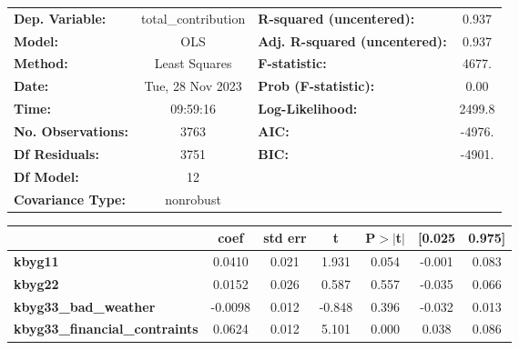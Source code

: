 \begin{center}
\begin{tabular}{lclc}
\toprule
\textbf{Dep. Variable:}                      & total\_contribution & \textbf{  R-squared (uncentered):}      &     0.937   \\
\textbf{Model:}                              &         OLS         & \textbf{  Adj. R-squared (uncentered):} &     0.937   \\
\textbf{Method:}                             &    Least Squares    & \textbf{  F-statistic:       }          &     4677.   \\
\textbf{Date:}                               &   Tue, 28 Nov 2023  & \textbf{  Prob (F-statistic):}          &     0.00    \\
\textbf{Time:}                               &       09:59:16      & \textbf{  Log-Likelihood:    }          &    2499.8   \\
\textbf{No. Observations:}                   &          3763       & \textbf{  AIC:               }          &    -4976.   \\
\textbf{Df Residuals:}                       &          3751       & \textbf{  BIC:               }          &    -4901.   \\
\textbf{Df Model:}                           &            12       & \textbf{                     }          &             \\
\textbf{Covariance Type:}                    &      nonrobust      & \textbf{                     }          &             \\
\bottomrule
\end{tabular}
\begin{tabular}{lcccccc}
                                             & \textbf{coef} & \textbf{std err} & \textbf{t} & \textbf{P$> |$t$|$} & \textbf{[0.025} & \textbf{0.975]}  \\
\midrule
\textbf{kbyg11}                              &       0.0410  &        0.021     &     1.931  &         0.054        &       -0.001    &        0.083     \\
\textbf{kbyg22}                              &       0.0152  &        0.026     &     0.587  &         0.557        &       -0.035    &        0.066     \\
\textbf{kbyg33\_bad\_weather}                &      -0.0098  &        0.012     &    -0.848  &         0.396        &       -0.032    &        0.013     \\
\textbf{kbyg33\_financial\_contraints}       &       0.0624  &        0.012     &     5.101  &         0.000        &        0.038    &        0.086     \\

\end{tabular}
\end{center}
